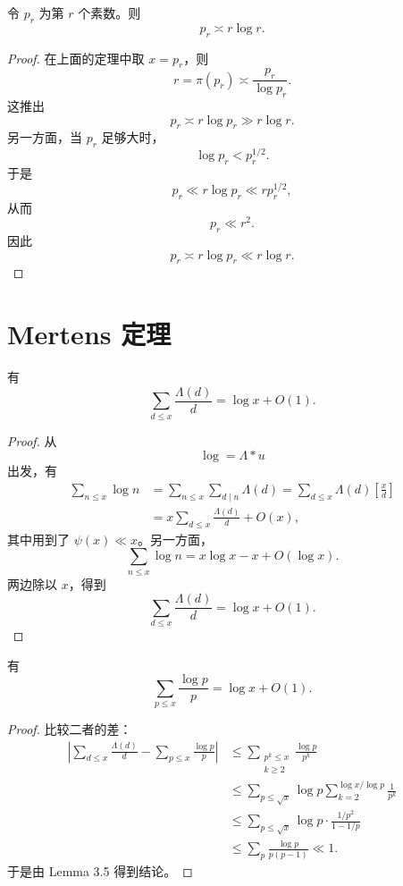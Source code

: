 \begin{corollary}[原文 Corollary 3.4]
	令 $p_r$ 为第 $r$ 个素数。则
	\[
		p_r\asymp r\log r.
	\]
\end{corollary}

\begin{proof}
	在上面的定理中取 $x=p_r$，则
	\[
		r=\pi(p_r)\asymp \frac{p_r}{\log p_r}.
	\]
	这推出
	\[
		p_r\asymp r\log p_r\gg r\log r.
	\]
	另一方面，当 $p_r$ 足够大时，
	\[
		\log p_r<p_r^{1/2}.
	\]
	于是
	\[
		p_r\ll r\log p_r\ll r p_r^{1/2},
	\]
	从而
	\[
		p_r\ll r^2.
	\]
	因此
	\[
		p_r\asymp r\log p_r\ll r\log r.
	\]
\end{proof}

\section{Mertens 定理}

\begin{lemma}[原文 Lemma 3.5]
	有
	\[
		\sum_{d\leq x}\frac{\Lambda(d)}d
		=
		\log x+O(1).
	\]
\end{lemma}

\begin{proof}
	从
	\[
		\log=\Lambda*u
	\]
	出发，有
	\[
	\begin{aligned}
		\sum_{n\leq x}\log n
		&=
		\sum_{n\leq x}\sum_{d\mid n}\Lambda(d)
		=
		\sum_{d\leq x}\Lambda(d)\left[\frac xd\right] \\
		&=
		x\sum_{d\leq x}\frac{\Lambda(d)}d+O(x),
	\end{aligned}
	\]
	其中用到了 $\psi(x)\ll x$。另一方面，
	\[
		\sum_{n\leq x}\log n=x\log x-x+O(\log x).
	\]
	两边除以 $x$，得到
	\[
		\sum_{d\leq x}\frac{\Lambda(d)}d=\log x+O(1).
	\]
\end{proof}

\begin{theorem}[原文 Theorem 3.6]
	有
	\[
		\sum_{p\leq x}\frac{\log p}{p}
		=
		\log x+O(1).
	\]
\end{theorem}

\begin{proof}
	比较二者的差：
	\[
	\begin{aligned}
		\left|
			\sum_{d\leq x}\frac{\Lambda(d)}d
			-
			\sum_{p\leq x}\frac{\log p}{p}
		\right|
		&\leq
		\sum_{\substack{p^k\leq x\\ k\geq 2}}\frac{\log p}{p^k} \\
		&\leq
		\sum_{p\leq \sqrt{x}}\log p
		\sum_{k=2}^{\log x/\log p}\frac1{p^k} \\
		&\leq
		\sum_{p\leq \sqrt{x}}
		\log p\cdot
		\frac{1/p^2}{1-1/p} \\
		&\leq
		\sum_p\frac{\log p}{p(p-1)}
		\ll 1.
	\end{aligned}
	\]
	于是由 Lemma 3.5 得到结论。
\end{proof}

